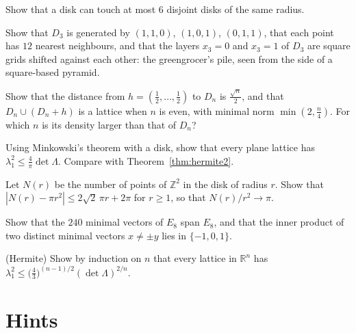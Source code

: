 \begin{exercise}[$\star$]\label{ex:kissing2}
Show that a disk can touch at most $6$ disjoint disks of the same radius.
\end{exercise}

\begin{exercise}[$\star\star$]\label{ex:fcc}
Show that $D_3$ is generated by $(1,1,0)$, $(1,0,1)$, $(0,1,1)$, that each point has $12$ nearest neighbours, and that the layers $x_3=0$ and $x_3=1$ of $D_3$
are square grids shifted against each other: the greengrocer's pile, seen from the side of a square-based pyramid.
\end{exercise}

\begin{exercise}[$\star\star$]\label{ex:deephole}
Show that the distance from $h=(\frac12,\dots,\frac12)$ to $D_n$ is $\frac{\sqrt n}2$, and that $D_n\cup(D_n+h)$ is a lattice when $n$ is even, with
minimal norm $\min(2,\frac n4)$. For which $n$ is its density larger than that of $D_n$?
\end{exercise}

\begin{exercise}[$\star\star$]\label{ex:minkowskibound}
Using Minkowski's theorem with a disk, show that every plane lattice has $\lambda_1^2\le\frac4\pi\det\Lambda$. Compare with Theorem~\ref{thm:hermite2}.
\end{exercise}

\begin{exercise}[$\star\star$]\label{ex:circlecount}
Let $N(r)$ be the number of points of $\mathbb Z^2$ in the disk of radius $r$. Show that $|N(r)-\pi r^2|\le 2\sqrt2\,\pi r+2\pi$ for $r\ge1$, so that $N(r)/r^2\to\pi$.
\end{exercise}

\begin{exercise}[$\star$]\label{ex:e8roots}
Show that the $240$ minimal vectors of $E_8$ span $E_8$, and that the inner product of two distinct minimal vectors $x\ne\pm y$ lies in $\{-1,0,1\}$.
\end{exercise}

\begin{exercise}[$\star\star\star$]\label{ex:hermite}
(Hermite) Show by induction on $n$ that every lattice in $\mathbb R^n$ has $\lambda_1^2\le\bigl(\frac43\bigr)^{(n-1)/2}(\det\Lambda)^{2/n}$.
\end{exercise}

\section{Hints}

